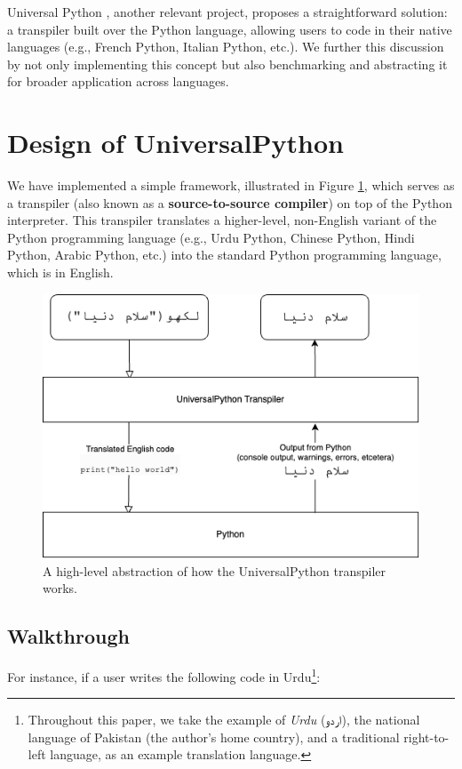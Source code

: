 \documentclass[conference]{IEEEtran}
\begin{document}
Universal Python \cite{otten2023towards}, another relevant project, proposes a straightforward solution: a transpiler built over the Python language, allowing users to code in their native languages (e.g., French Python, Italian Python, etc.). We further this discussion by not only implementing this concept but also benchmarking and abstracting it for broader application across languages.

\section{Design of UniversalPython}

We have implemented a simple framework, illustrated in Figure \ref{fig:flowchart}, which serves as a transpiler (also known as a \textbf{source-to-source compiler}) on top of the Python interpreter. This transpiler translates a higher-level, non-English variant of the Python programming language (e.g., Urdu Python, Chinese Python, Hindi Python, Arabic Python, etc.) into the standard Python programming language, which is in English.

\begin{figure}[htbp]
\centerline{\includegraphics[width=\columnwidth]{UniversalPython-flowchart.png}}
\caption{A high-level abstraction of how the UniversalPython transpiler works.}
\label{fig:flowchart}
\end{figure}

\subsection{Walkthrough}

For instance, if a user writes the following code in Urdu\footnote{Throughout this paper, we take the example of \textit{Urdu} (\texturdu{اردو}), the national language of Pakistan (the author's home country), and a traditional right-to-left language, as an example translation language.}:
\end{document}
